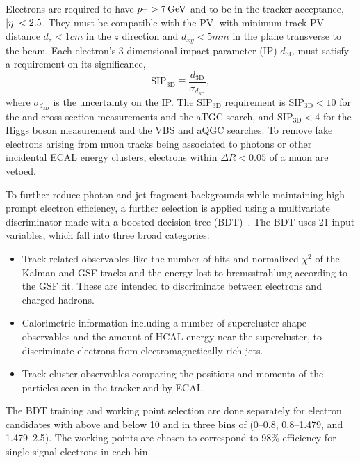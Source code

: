Electrons are required to have $p_\mathrm{T} > 7\,\mathrm{Ge\hspace{-.08em}V}$ and to be in the tracker acceptance, $\lvert \eta \rvert < 2.5$.
They must be compatible with the PV, with minimum track-PV distance $d_z < 1\unit{cm}$ in the $z$ direction and $d_{xy} < 5\unit{mm}$ in the plane transverse to the beam.
Each electron's 3-dimensional impact parameter (IP) $d_\text{3D}$ must satisfy a requirement on its significance,
\begin{equation}
  \text{SIP}_\text{3D} \equiv \frac{d_\text{3D}}{\sigma_{d_\text{3D}}},
\end{equation}
where $\sigma_{d_\text{3D}}$ is the uncertainty on the IP\@.
The $\text{SIP}_\text{3D}$ requirement is $\text{SIP}_\text{3D} < 10$ for the {\ZZ} and {\Zfourl} cross section measurements and the aTGC search, and $\text{SIP}_\text{3D} < 4$ for the Higgs boson measurement and the VBS and aQGC searches.
To remove fake electrons arising from muon tracks being associated to photons or other incidental ECAL energy clusters, electrons within $\Delta R < 0.05$ of a muon are vetoed.

To further reduce photon and jet fragment backgrounds while maintaining high prompt electron efficiency, a further selection is applied using a multivariate discriminator made with a boosted decision tree (BDT)~\cite{CMS:2010bta,Khachatryan:2015hwa}.
The BDT uses 21 input variables, which fall into three broad categories:
\begin{itemize}
  \item Track-related observables like the number of hits and normalized $\chi^2$ of the Kalman and GSF tracks and the energy lost to bremsstrahlung according to the GSF fit. These are intended to discriminate between electrons and charged hadrons.
  \item Calorimetric information including a number of supercluster shape observables and the amount of HCAL energy near the supercluster, to discriminate electrons from electromagnetically rich jets.
  \item Track-cluster observables comparing the positions and momenta of the particles seen in the tracker and by ECAL\@.
\end{itemize}
The BDT training and working point selection are done separately for electron candidates with {\pt} above and below {10\GeV} and in three bins of {\abseta} (0--0.8, 0.8--1.479, and 1.479--2.5).
The working points are chosen to correspond to 98\% efficiency for single signal electrons in each bin.


